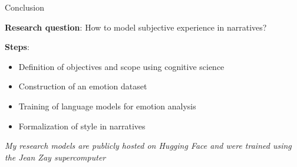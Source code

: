 \documentclass[handout,10pt]{beamer}
\begin{document}
\begin{frame}{Conclusion}

\textbf{Research question}: How to model subjective experience in narratives?

\vspace{0.5cm}
\pause

\textbf{Steps}:

\begin{itemize}[<+->]
    \item Definition of objectives and scope using cognitive science
    \item Construction of an emotion dataset 
    \item Training of language models for emotion analysis 
    \item Formalization of style in narratives
\end{itemize}

\vspace{0.5cm}

\small

\textit{My research models are publicly hosted on Hugging Face and were trained using the Jean Zay supercomputer}
    
\end{frame}
\end{document}
